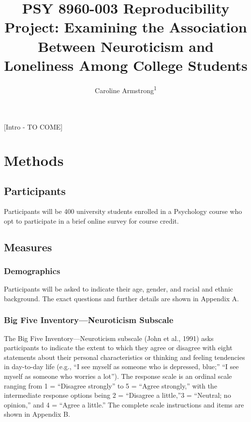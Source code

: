 \documentclass[
  english,
  man]{apa6}
\title{PSY 8960-003 Reproducibility Project: Examining the Association Between Neuroticism and Loneliness Among College Students}
\author{Caroline Armstrong\textsuperscript{1}}
\date{}
\affiliation{\vspace{0.5cm}\textsuperscript{1} Department of Psychology, University of Minnesota}
\begin{document}
\maketitle

{[}Intro - TO COME{]}

\section{Methods}\label{methods}

\subsection{Participants}\label{participants}

Participants will be 400 university students enrolled in a Psychology course who opt to participate in a brief online survey for course credit.

\subsection{Measures}\label{measures}

\subsubsection{Demographics}\label{demographics}

Participants will be asked to indicate their age, gender, and racial and ethnic background. The exact questions and further details are shown in Appendix A.

\subsubsection{Big Five Inventory---Neuroticism Subscale}\label{big-five-inventoryneuroticism-subscale}

The Big Five Inventory---Neuroticism subscale (John et al., 1991) asks participants to indicate the extent to which they agree or disagree with eight statements about their personal characteristics or thinking and feeling tendencies in day-to-day life (e.g., ``I see myself as someone who is depressed, blue;'' ``I see myself as someone who worries a lot''). The response scale is an ordinal scale ranging from 1 = ``Disagree strongly'' to 5 = ``Agree strongly,'' with the intermediate response options being 2 = ``Disagree a little,''3 = ``Neutral; no opinion,'' and 4 = ``Agree a little.'' The complete scale instructions and items are shown in Appendix B.
\end{document}
